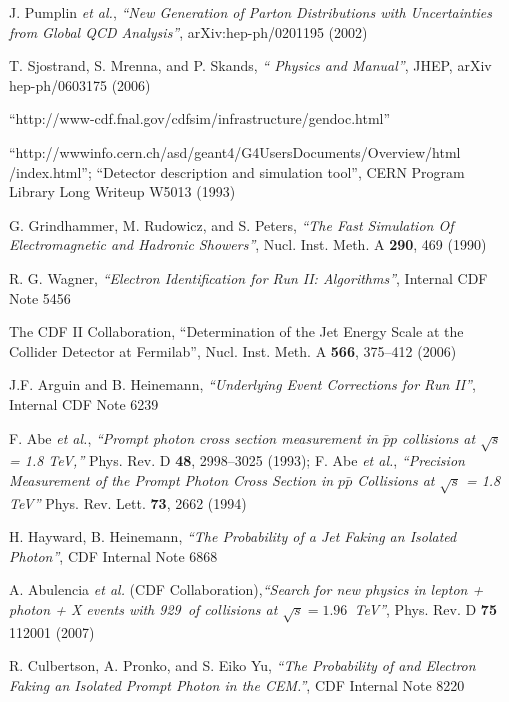\begin{thebibliography}{1}
 J. Pumplin {\it et al.}, \textit{``New Generation of Parton Distributions with Uncertainties from Global QCD Analysis''}, arXiv:hep-ph/0201195 (2002)

 T. Sjostrand, S. Mrenna, and P. Skands, \textit{`` Physics and Manual''}, JHEP, arXiv hep-ph/0603175 (2006)

 ``http://www-cdf.fnal.gov/cdfsim/infrastructure/gendoc.html''

 ``http://wwwinfo.cern.ch/asd/geant4/G4UsersDocuments/Overview/html /index.html''; ``Detector description and simulation tool'', CERN Program Library Long Writeup W5013 (1993)

 G. Grindhammer, M. Rudowicz, and S. Peters, \textit{``The Fast Simulation Of Electromagnetic and Hadronic Showers''}, Nucl. Inst. Meth. A \textbf{290}, 469 (1990)

 R. G. Wagner, \textit{``Electron Identification for Run II: Algorithms''}, Internal CDF Note 5456

 The CDF II Collaboration, ``Determination of the Jet Energy Scale at the Collider Detector at Fermilab'', Nucl. Inst. Meth. A \textbf{566}, 375--412 (2006)

 J.F. Arguin and B. Heinemann, \textit{``Underlying Event Corrections for Run II''}, Internal CDF Note 6239

 F. Abe \textit{et al.}, \textit{``Prompt photon cross section measurement in $\bar{p}p$ collisions at $\sqrt{s}$ = 1.8 TeV,''} Phys. Rev. D {\bf 48}, 2998--3025 (1993); F. Abe \textit{et al.}, \textit{``Precision Measurement of the Prompt Photon Cross Section in $p\bar{p}$ Collisions at $\sqrt{s}$ = 1.8 TeV''} Phys. Rev. Lett. {\bf 73}, 2662 (1994)

 H. Hayward, B. Heinemann, \textit{``The Probability of a Jet Faking an Isolated Photon''}, CDF Internal Note 6868

 A. Abulencia \textit{et al.} (CDF Collaboration),\textit{``Search for new physics in lepton + photon + X events with 929~\pbi of \ppbar collisions at $\sqrt{s}=1.96$~TeV''}, Phys. Rev. D \textbf{75} 112001 (2007)

 R. Culbertson, A. Pronko, and S. Eiko Yu, \textit{``The Probability of and Electron Faking an Isolated Prompt Photon in the CEM.''}, CDF Internal Note 8220


\end{thebibliography}
